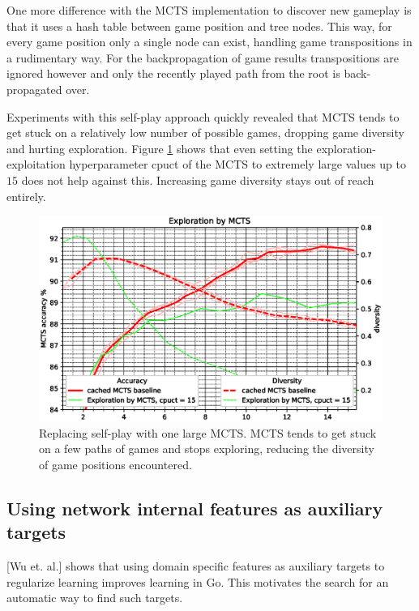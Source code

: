 \documentclass[12pt,onecolumn,oneside,titlepage]{article}
\begin{document}
One more difference with the MCTS implementation to discover new gameplay is that it uses a hash table between game position and tree nodes. This way, for every game position only a single node can exist, handling game transpositions in a rudimentary way. For 
the backpropagation of game results transpositions are ignored however and only the recently played path from the root is back-propagated over.

Experiments with this self-play approach quickly revealed that MCTS tends to get stuck on a relatively low number of possible games, dropping game diversity and hurting exploration. 
Figure \ref{fig:mcts_tree_explore} shows that even setting the exploration-exploitation hyperparameter cpuct of the MCTS to extremely large values up to $15$ does not help against this.
Increasing game diversity stays out of reach entirely.

\begin{figure}[H]
\centering
\includegraphics[clip,width=\columnwidth]{mcts_tree_explore}
\caption{Replacing self-play with one large MCTS. MCTS tends to get stuck on a few paths of games and stops exploring, reducing the diversity of game positions encountered.}
\label{fig:mcts_tree_explore}
\end{figure}


\subsection{Using network internal features as auxiliary targets}

\cite{wu2019accelerating}[Wu et. al.] shows that using domain specific features as auxiliary targets to regularize learning improves learning in Go. This motivates the search for an automatic way to find such targets.
\end{document}

